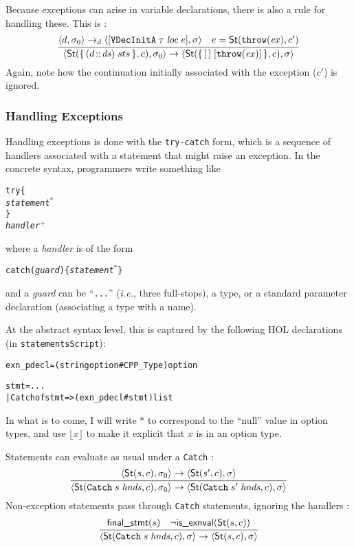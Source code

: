 \documentclass[11pt]{article}
\newcommand{\ie}{\emph{i.e.}}
\begin{document}
Because exceptions can arise in variable declarations, there is also a
rule for handling these.  This is :
\[
\infer{
  \statebrack{
    \textsf{St}(\mathbf{\{}\,(d\!::\!\mathit{ds})\;sts\,\mathbf{\}}, c),
    \sigma_0
  }
  \to
  \statebrack{
    \textsf{St}(\mathbf{\{}\,[\,]\;[\texttt{throw}(\mathit{ex})]\,\mathbf{\}}, c),
    \sigma
  }
}{
  \statebrack{d,\sigma_0}\to_d
  \statebrack{[\texttt{VDecInitA}\;\tau\;\mathit{loc}\;e], \sigma}
  &
  e = \textsf{St}(\texttt{throw}(\mathit{ex}), c')
}
\]
Again, note how the continuation initially associated with the
exception ($c'$) is ignored.


\subsubsection{Handling Exceptions}

Handling exceptions is done with the \texttt{try-catch} form, which is a
sequence of handlers associated with a statement that might raise an
exception.  In the concrete syntax, programmers write something like
\newcommand{\suplus}{\ensuremath{^+}}
\newcommand{\sustar}{\ensuremath{^*}}
\begin{alltt}
   try \{
     \emph{statement}\sustar
   \}
   \emph{handler}\suplus
\end{alltt}
where a \emph{handler} is of the form
\begin{alltt}
   catch (\emph{guard}) \{ \emph{statement}\sustar \}
\end{alltt}
and a \emph{guard} can be ``\texttt{...}'' (\ie, three full-stops), a
type, or a standard parameter declaration (associating a type with a
name).

At the abstract syntax level, this is captured by the following HOL
declarations (in \texttt{statementsScript}):
\begin{alltt}
   exn_pdecl = (string option # CPP_Type) option

   stmt = ...
        | Catch of stmt => (exn_pdecl # stmt) list
\end{alltt}
In what is to come, I will write $*$ to correspond to the ``null''
value in option types, and use $\lfloor x\rfloor$ to make it explicit
that $x$ is in an option type.

\bigskip
\noindent
Statements can evaluate as usual under a \texttt{Catch}
:
\[
\infer{
  \statebrack{\textsf{St}(\texttt{Catch}\;s\;\mathit{hnds}, c),
    \sigma_0}
  \to
  \statebrack{\textsf{St}(\texttt{Catch}\;s'\;\mathit{hnds}, c),
    \sigma}
}{
  \statebrack{\textsf{St}(s,c),\sigma_0}\to
  \statebrack{\textsf{St}(s',c),\sigma}
}
\]
Non-exception statements pass through \texttt{Catch} statements,
ignoring the handlers :
\[
\infer{
  \statebrack{
    \textsf{St}(\texttt{Catch}\;s\;\mathit{hnds}, c),
    \sigma
  }
  \to
  \statebrack{\textsf{St}(s,c), \sigma}
}{
  \textsf{final\_stmt}(s) &
  \lnot\textsf{is\_exnval}(\textsf{St}(s,c))
}
\]
\end{document}

